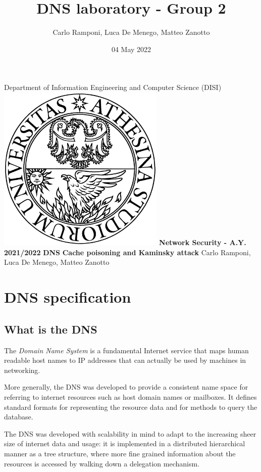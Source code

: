 \documentclass[11pt,a4paper]{article}
\title{DNS laboratory - Group 2}
\author{Carlo Ramponi, Luca De Menego, Matteo Zanotto}
\date{04 May 2022}
\begin{document}
\begin{titlepage}

\centering
    \vfill
    \vskip3cm
    \Large Department of Information Engineering and Computer Science
    \vskip0.5cm
    \Large (DISI)
    \vskip2cm
    \includegraphics[width=8cm]{logo_unitn.png}
    \vskip2cm
    \textbf{\Large Network Security - A.Y. 2021/2022}
    \vskip2cm
    \textbf{\LARGE DNS}
    \vskip0.2cm
    \textbf{\LARGE Cache poisoning and Kaminsky attack}
    \vskip4cm
    \Large Carlo Ramponi, Luca De Menego, Matteo Zanotto
    \vfill

\end{titlepage}

\clearpage

\tableofcontents

\clearpage

\section{DNS specification}

\subsection{What is the DNS}

The \emph{Domain Name System} is a fundamental Internet service that maps human readable host names to IP addresses that can actually be used by machines in networking.

\noindent
More generally, the DNS was developed to provide a consistent name space for referring to internet resources such as host domain names or mailboxes.
It defines standard formats for representing the resource data and for methods to query the database.

\hfill \break
\noindent
The DNS was developed with scalability in mind to adapt to the increasing sheer size of internet data and usage: it is implemented in a distributed hierarchical manner as a tree structure, where more fine grained information about the resources is accessed by walking down a delegation mechanism.
\end{document}
